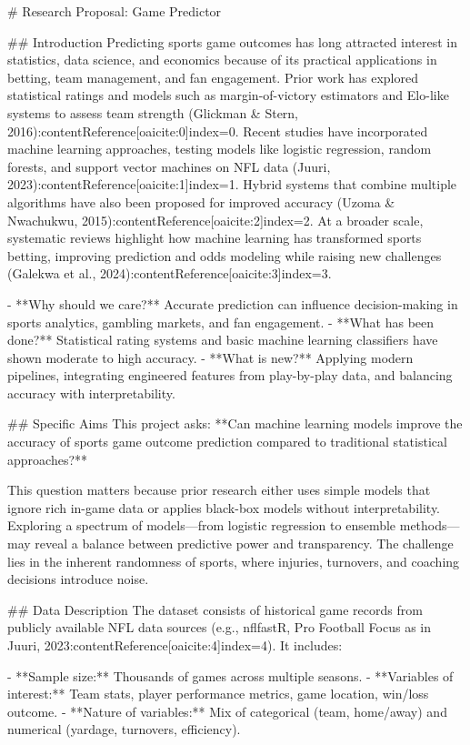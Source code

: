# Research Proposal: Game Predictor

## Introduction
Predicting sports game outcomes has long attracted interest in statistics, data science, and economics because of its practical applications in betting, team management, and fan engagement. Prior work has explored statistical ratings and models such as margin-of-victory estimators and Elo-like systems to assess team strength (Glickman & Stern, 2016):contentReference[oaicite:0]{index=0}. Recent studies have incorporated machine learning approaches, testing models like logistic regression, random forests, and support vector machines on NFL data (Juuri, 2023):contentReference[oaicite:1]{index=1}. Hybrid systems that combine multiple algorithms have also been proposed for improved accuracy (Uzoma & Nwachukwu, 2015):contentReference[oaicite:2]{index=2}. At a broader scale, systematic reviews highlight how machine learning has transformed sports betting, improving prediction and odds modeling while raising new challenges (Galekwa et al., 2024):contentReference[oaicite:3]{index=3}.

- **Why should we care?** Accurate prediction can influence decision-making in sports analytics, gambling markets, and fan engagement.  
- **What has been done?** Statistical rating systems and basic machine learning classifiers have shown moderate to high accuracy.  
- **What is new?** Applying modern pipelines, integrating engineered features from play-by-play data, and balancing accuracy with interpretability.  

## Specific Aims
This project asks: **Can machine learning models improve the accuracy of sports game outcome prediction compared to traditional statistical approaches?**

This question matters because prior research either uses simple models that ignore rich in-game data or applies black-box models without interpretability. Exploring a spectrum of models—from logistic regression to ensemble methods—may reveal a balance between predictive power and transparency. The challenge lies in the inherent randomness of sports, where injuries, turnovers, and coaching decisions introduce noise.

## Data Description
The dataset consists of historical game records from publicly available NFL data sources (e.g., nflfastR, Pro Football Focus as in Juuri, 2023:contentReference[oaicite:4]{index=4}). It includes:

- **Sample size:** Thousands of games across multiple seasons.  
- **Variables of interest:** Team stats, player performance metrics, game location, win/loss outcome.  
- **Nature of variables:** Mix of categorical (team, home/away) and numerical (yardage, turnovers, efficiency).  

